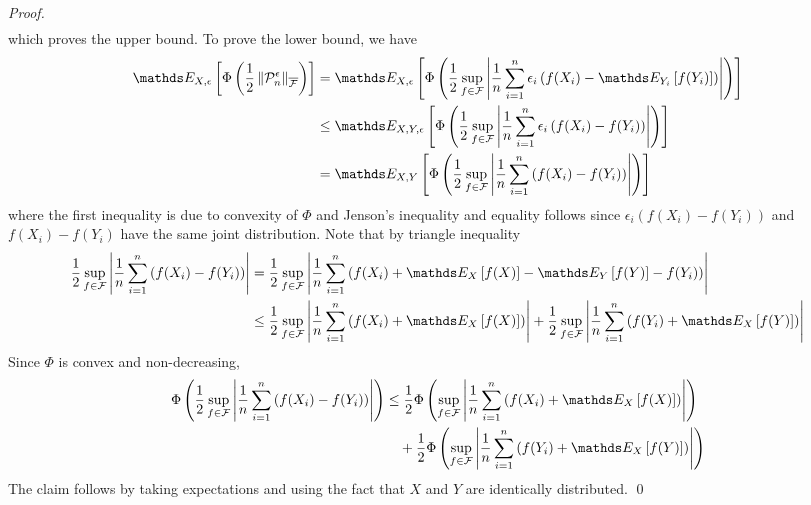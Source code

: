 \documentclass[11pt]{article}
\begin{document}
\begin{itemize}
\begin{proof}
\begin{align*}
\end{align*} which proves the upper bound. To prove the lower bound, we have
\begin{align*}
\E{X, \epsilon}{\Phi\paren{\frac{1}{2}\norm{\cP_n^{\epsilon}}{\overline{\cF}}}} &=  \E{X, \epsilon}{\Phi\paren{\frac{1}{2}\sup_{f\in \cF}\abs{ \frac{1}{n}\sum_{i=1}^n \epsilon_i \paren{f(X_i)  - \E{Y_i}{f(Y_i)} }}}}\\
&\le  \E{X, Y, \epsilon}{\Phi\paren{\frac{1}{2}\sup_{f\in \cF}\abs{ \frac{1}{n}\sum_{i=1}^n \epsilon_i \paren{f(X_i)  - f(Y_i) }}}}\\
&=  \E{X, Y}{\Phi\paren{\frac{1}{2}\sup_{f\in \cF}\abs{ \frac{1}{n}\sum_{i=1}^n \paren{f(X_i)  - f(Y_i) }}}}
\end{align*} where the first inequality is due to convexity of $\Phi$ and Jenson's inequality and equality follows since $\epsilon_i(f(X_i) - f(Y_i))$ and $f(X_i) - f(Y_i)$ have the same joint distribution. Note that by triangle inequality
\begin{align*}
\frac{1}{2}\sup_{f\in \cF}\abs{ \frac{1}{n}\sum_{i=1}^n \paren{f(X_i)  - f(Y_i) }} &= \frac{1}{2}\sup_{f\in \cF}\abs{ \frac{1}{n}\sum_{i=1}^n \paren{f(X_i)  + \E{X}{f(X)} - \E{Y}{f(Y)} - f(Y_i) }} \\
&\le \frac{1}{2}\sup_{f\in \cF}\abs{\frac{1}{n}\sum_{i=1}^n \paren{f(X_i)  + \E{X}{f(X)}}} + \frac{1}{2}\sup_{f\in \cF}\abs{\frac{1}{n}\sum_{i=1}^n \paren{f(Y_i)  + \E{X}{f(Y)}}} 
\end{align*} Since $\Phi$ is convex and non-decreasing, 
\begin{align*}
\Phi\paren{\frac{1}{2}\sup_{f\in \cF}\abs{ \frac{1}{n}\sum_{i=1}^n \paren{f(X_i)  - f(Y_i) }}} &\le\frac{1}{2} \Phi\paren{\sup_{f\in \cF}\abs{\frac{1}{n}\sum_{i=1}^n \paren{f(X_i) + \E{X}{f(X)}}}} \\
&\quad  + \frac{1}{2} \Phi\paren{\sup_{f\in \cF}\abs{\frac{1}{n}\sum_{i=1}^n \paren{f(Y_i)  + \E{X}{f(Y)}}} }
\end{align*} The claim follows by taking expectations and using the fact that $X$ and $Y$ are identically distributed. \qed
\end{proof}



\end{itemize}
\end{document}

